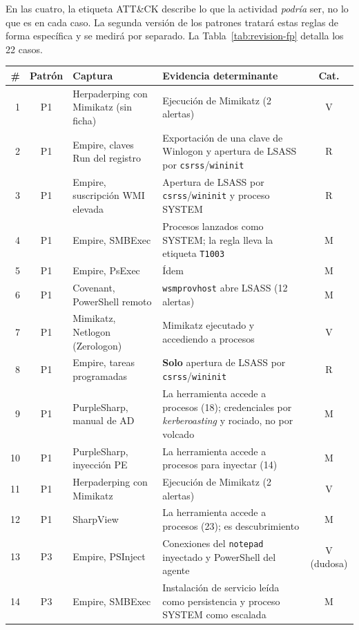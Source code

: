 En las cuatro, la etiqueta ATT\&CK describe lo que la actividad \emph{podría} ser, no lo que
es en cada caso. La segunda versión de los patrones tratará estas reglas de forma específica
y se medirá por separado. La Tabla~\ref{tab:revision-fp} detalla los 22 casos.

\begin{table}[H]
\centering
\footnotesize
\begin{tabularx}{\textwidth}{|r|c|p{4.2cm}|X|c|}
\hline
\textbf{\#} & \textbf{Patrón} & \textbf{Captura} & \textbf{Evidencia determinante} & \textbf{Cat.} \\
\hline
1 & P1 & Herpaderping con Mimikatz (sin ficha) & Ejecución de Mimikatz (2 alertas) & V \\
2 & P1 & Empire, claves Run del registro & Exportación de una clave de Winlogon y apertura de LSASS por \texttt{csrss}/\texttt{wininit} & R \\
3 & P1 & Empire, suscripción WMI elevada & Apertura de LSASS por \texttt{csrss}/\texttt{wininit} y proceso SYSTEM & R \\
4 & P1 & Empire, SMBExec & Procesos lanzados como SYSTEM; la regla lleva la etiqueta \texttt{T1003} & M \\
5 & P1 & Empire, PsExec & Ídem & M \\
6 & P1 & Covenant, PowerShell remoto & \texttt{wsmprovhost} abre LSASS (12 alertas) & M \\
7 & P1 & Mimikatz, Netlogon (Zerologon) & Mimikatz ejecutado y accediendo a procesos & V \\
8 & P1 & Empire, tareas programadas & \textbf{Solo} apertura de LSASS por \texttt{csrss}/\texttt{wininit} & R \\
9 & P1 & PurpleSharp, manual de AD & La herramienta accede a procesos (18); credenciales por \textit{kerberoasting} y rociado, no por volcado & M \\
10 & P1 & PurpleSharp, inyección PE & La herramienta accede a procesos para inyectar (14) & M \\
11 & P1 & Herpaderping con Mimikatz & Ejecución de Mimikatz (2 alertas) & V \\
12 & P1 & SharpView & La herramienta accede a procesos (23); es descubrimiento & M \\
13 & P3 & Empire, PSInject & Conexiones del \texttt{notepad} inyectado y PowerShell del agente & V (dudosa) \\
14 & P3 & Empire, SMBExec & Instalación de servicio leída como persistencia y proceso SYSTEM como escalada & M \\

\end{tabularx}
\end{table}
